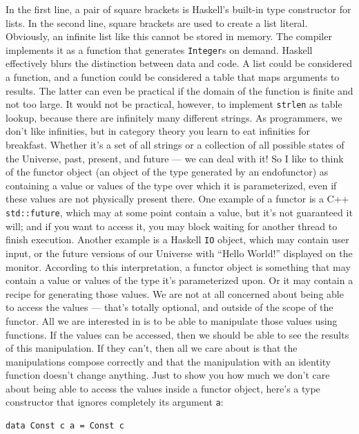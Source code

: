 In the first line, a pair of square brackets is Haskell's built-in type
constructor for lists. In the second line, square brackets are used to
create a list literal. Obviously, an infinite list like this cannot be
stored in memory. The compiler implements it as a function that
generates \texttt{Integer}s on demand. Haskell effectively blurs the
distinction between data and code. A list could be considered a
function, and a function could be considered a table that maps arguments
to results. The latter can even be practical if the domain of the
function is finite and not too large. It would not be practical,
however, to implement \texttt{strlen} as table lookup, because there are
infinitely many different strings. As programmers, we don't like
infinities, but in category theory you learn to eat infinities for
breakfast. Whether it's a set of all strings or a collection of all
possible states of the Universe, past, present, and future --- we can
deal with it! So I like to think of the functor object (an object of the
type generated by an endofunctor) as containing a value or values of the
type over which it is parameterized, even if these values are not
physically present there. One example of a functor is a C++
\texttt{std::future}, which may at some point contain a value, but it's
not guaranteed it will; and if you want to access it, you may block
waiting for another thread to finish execution. Another example is a
Haskell \texttt{IO} object, which may contain user input, or the future
versions of our Universe with ``Hello World!'' displayed on the monitor.
According to this interpretation, a functor object is something that may
contain a value or values of the type it's parameterized upon. Or it may
contain a recipe for generating those values. We are not at all
concerned about being able to access the values --- that's totally
optional, and outside of the scope of the functor. All we are interested
in is to be able to manipulate those values using functions. If the
values can be accessed, then we should be able to see the results of
this manipulation. If they can't, then all we care about is that the
manipulations compose correctly and that the manipulation with an
identity function doesn't change anything. Just to show you how much we
don't care about being able to access the values inside a functor
object, here's a type constructor that ignores completely its argument
\texttt{a}:

\begin{verbatim}
data Const c a = Const c
\end{verbatim}

